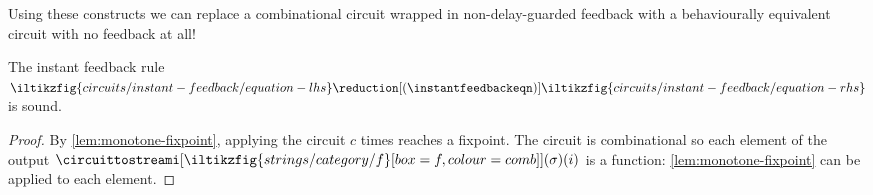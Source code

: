 Using these constructs we can replace a combinational circuit wrapped in
non-delay-guarded feedback with a behaviourally equivalent circuit with no
feedback at all!

\begin{proposition}\label{prop:instant-feedback}
    The instant feedback rule \(
        \iltikzfig{circuits/instant-feedback/equation-lhs}
        \reduction[(\instantfeedbackeqn)]
        \iltikzfig{circuits/instant-feedback/equation-rhs}
    \) is sound.
\end{proposition}
\begin{proof}
    By \cref{lem:monotone-fixpoint}, applying the circuit \(c\)
    times reaches a fixpoint.
    The circuit is combinational so each element of the output
    \(\circuittostreami[
        \iltikzfig{strings/category/f}[box=f,colour=comb]
    ](\sigma)(i)\) is a function: \cref{lem:monotone-fixpoint} can be applied to
    each element.
\end{proof}